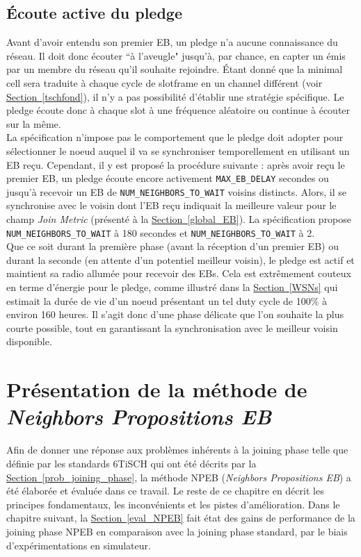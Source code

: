 \documentclass[]{report}
\newcommand{\wordlink}[2]{\hyperref[#2]{#1~\ref{#2}}}
\begin{document}
\subsection{Écoute active du pledge}

Avant d'avoir entendu son premier EB, un pledge n'a aucune connaissance du réseau. Il doit donc écouter ``à l'aveugle" jusqu'à, par chance, en capter un émis par un membre du réseau qu'il souhaite rejoindre. Étant donné que la minimal cell sera traduite à chaque cycle de slotframe en un channel différent (voir \wordlink{Section}{tschfond}), il n'y a pas possibilité d'établir une stratégie spécifique. Le pledge écoute donc à chaque slot à une fréquence aléatoire ou continue à écouter sur la même.\\

La spécification \cite{rfc8180} n'impose pas le comportement que le pledge doit adopter pour sélectionner le noeud auquel il va se synchroniser temporellement en utilisant un EB reçu. Cependant, il y est proposé la procédure suivante : après avoir reçu le premier EB, un pledge écoute encore activement \texttt{MAX\_EB\_DELAY} secondes ou jusqu'à recevoir un EB de \texttt{NUM\_NEIGHBORS\_TO\_WAIT} voisins distincts. Alors, il se synchronise avec le voisin dont l'EB reçu indiquait la meilleure valeur pour le champ \textit{Join Metric} (présenté à la \wordlink{Section}{global_EB}). La spécification \cite{rfc8180} propose \texttt{NUM\_NEIGHBORS\_TO\_WAIT} à 180 secondes et \texttt{NUM\_NEIGHBORS\_TO\_WAIT} à 2.\\

Que ce soit durant la première phase (avant la réception d'un premier EB) ou durant la seconde (en attente d'un potentiel meilleur voisin), le pledge est actif et maintient sa radio allumée pour recevoir des EBs. Cela est extrêmement couteux en terme d'énergie pour le pledge, comme illustré dans la \wordlink{Section}{WSNs} qui estimait la durée de vie d'un noeud présentant un tel duty cycle de 100\% à environ 160 heures. Il s'agit donc d'une phase délicate que l'on souhaite la plus courte possible, tout en garantissant la synchronisation avec le meilleur voisin disponible.

\newpage

\section{Présentation de la méthode de \textit{Neighbors Propositions EB}}
\label{intuition_NPEB}

Afin de donner une réponse aux problèmes inhérents à la joining phase telle que définie par les standards 6TiSCH qui ont été décrits par la \wordlink{Section}{prob_joining_phase}, la méthode NPEB (\textit{Neighbors Propositions EB}) a été élaborée et évaluée dans ce travail. Le reste de ce chapitre en décrit les principes fondamentaux, les inconvénients et les pistes d'amélioration. Dans le chapitre suivant, la \wordlink{Section}{eval_NPEB} fait état des gains de performance de la joining phase NPEB en comparaison avec la joining phase standard, par le biais d'expérimentations en simulateur.
\end{document}
